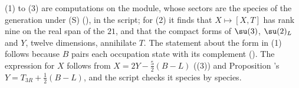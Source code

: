 (1) to (3) are computations on the module, whose sectors are the species of the generation under (S) (), in the script; for (2) it finds that $X \mapsto [X, T]$ has rank nine on the real span of the $21$, and that the compact forms of $\su(3)$, $\su(2)_{L}$ and $Y$, twelve dimensions, annihilate $T$. The statement about the form in (1) follows because $B$ pairs each occupation state with its complement (). The expression for $X$ follows from $X = 2Y - \tfrac52(B - L)$ ((3)) and Proposition 's $Y = T_{3R} + \tfrac12(B - L)$, and the script checks it species by species.
